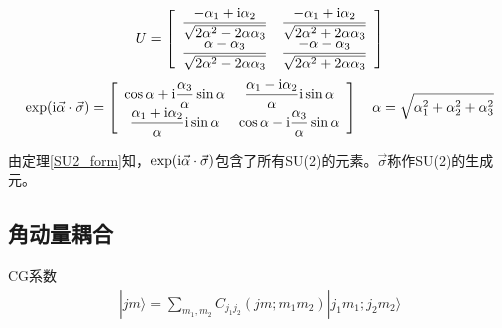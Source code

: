 $$U=\left[\begin{array}{cc}
    \dfrac{-\alpha_1+\mathrm{i}\alpha_2}{\sqrt{2\alpha^2-2\alpha\alpha_3}}&\dfrac{-\alpha_1+\mathrm{i}\alpha_2}{\sqrt{2\alpha^2+2\alpha\alpha_3}}\\
    \dfrac{\alpha-\alpha_3}{\sqrt{2\alpha^2-2\alpha\alpha_3}}&\dfrac{-\alpha-\alpha_3}{\sqrt{2\alpha^2+2\alpha\alpha_3}}
\end{array}\right]$$
$$\exp(\mathrm{i}\vec{\alpha}\cdot\vec{\sigma})=\left[\begin{array}{cc}
    \cos\alpha+\mathrm{i}\dfrac{\alpha_3}{\alpha}\sin\alpha&\dfrac{\alpha_1-\mathrm{i}\alpha_2}{\alpha}\mathrm{i}\sin\alpha\\
    \dfrac{\alpha_1+\mathrm{i}\alpha_2}{\alpha}\mathrm{i}\sin\alpha&\cos\alpha-\mathrm{i}\dfrac{\alpha_3}{\alpha}\sin\alpha
\end{array}\right]\quad\alpha=\sqrt{\alpha_1^2+\alpha_2^2+\alpha_3^2}$$

由定理\ref{SU2_form}知，$\exp(\mathrm{i}\vec{\alpha}\cdot\vec{\sigma})$包含了所有SU(2)的元素。$\vec{\sigma}$称作SU(2)的生成元。
\subsection{角动量耦合}
CG系数
\begin{align}\label{CG-defination}
  |jm\rangle = \sum_{m_1,m_2}C_{j_1 j_2}(jm;m_1m_2)|j_1 m_1;j_2 m_2\rangle  
\end{align}

